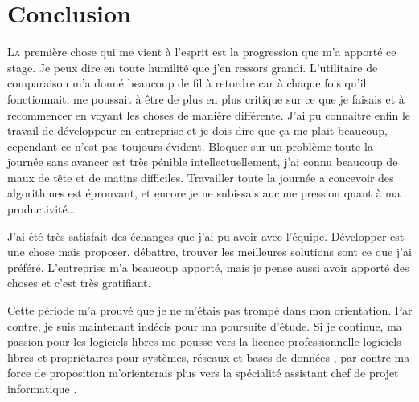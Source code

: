 \chapter{Conclusion} %
\label{cha:Conclusion}

\lettrine{L}{a} première chose qui me vient à l'esprit est la
progression que m'a apporté ce stage. Je peux dire en toute humilité que
j'en ressors grandi.  L'utilitaire de comparaison m'a donné beaucoup de
fil à retordre car à chaque fois qu'il fonctionnait,  me
poussait à être de plus en plus critique sur ce que je faisais et à
recommencer en voyant les choses de manière différente.  J'ai pu
connaitre enfin le travail de développeur en entreprise et je dois dire
que ça me plait beaucoup, cependant ce n'est pas toujours évident.
Bloquer sur un problème toute la journée sans avancer est très pénible
intellectuellement, j'ai connu beaucoup de maux de tête et de matins
difficiles. Travailler toute la journée a concevoir des algorithmes est
éprouvant, et encore je ne subissais aucune pression quant à ma
productivité\dots

J'ai été très satisfait des échanges que j'ai pu avoir avec l'équipe.
Développer est une chose mais proposer, débattre, trouver les meilleures
solutions sont ce que j'ai préféré. L'entreprise m'a beaucoup apporté,
mais je pense aussi avoir apporté des choses et c'est très gratifiant.

Cette période m'a prouvé que je ne m'étais pas trompé dans mon
orientation. Par contre, je suis maintenant indécis pour ma poursuite
d'étude. Si je continue, ma passion pour les logiciels libres me pousse
vers la licence professionnelle \og logiciels libres et propriétaires
pour systèmes, réseaux et bases de données \fg{}, par contre ma force de
proposition m'orienterais plus vers la \og spécialité assistant chef de
projet informatique \fg{}.
